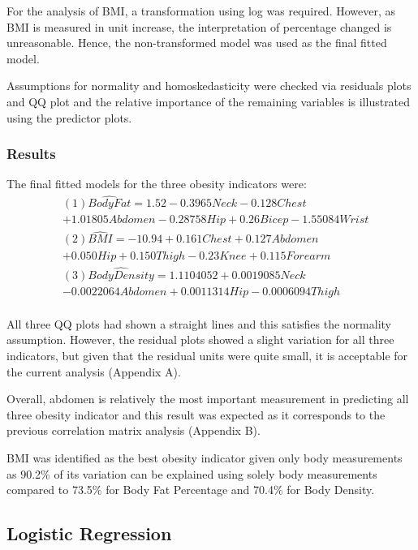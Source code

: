 \documentclass[a4paper,9pt,twocolumn,twoside,]{pinp}
\begin{document}
For the analysis of BMI, a transformation using log was required.
However, as BMI is measured in unit increase, the interpretation of
percentage changed is unreasonable. Hence, the non-transformed model was
used as the final fitted model.

Assumptions for normality and homoskedasticity were checked via
residuals plots and QQ plot and the relative importance of the remaining
variables is illustrated using the predictor plots.

\hypertarget{results}{%
\subsubsection{Results}\label{results}}

The final fitted models for the three obesity indicators were: \[ 
\begin{aligned}
&(1) \hat{Body Fat} = 1.52 -0.3965Neck - 0.128Chest\\
&+ 1.01805Abdomen -0.28758Hip + 0.26Bicep -1.55084Wrist\\
&(2) \hat{BMI} = -10.94 +0.161Chest + 0.127Abdomen\\
&+ 0.050Hip + 0.150Thigh - 0.23Knee + 0.115Forearm\\
&(3)\hat{Body Density} = 1.1104052 + 0.0019085 Neck\\
&- 0.0022064Abdomen + 0.0011314 Hip - 0.0006094 Thigh\\
\end{aligned}
\]

All three QQ plots had shown a straight lines and this satisfies the
normality assumption. However, the residual plots showed a slight
variation for all three indicators, but given that the residual units
were quite small, it is acceptable for the current analysis (Appendix
A).

Overall, abdomen is relatively the most important measurement in
predicting all three obesity indicator and this result was expected as
it corresponds to the previous correlation matrix analysis (Appendix B).

BMI was identified as the best obesity indicator given only body
measurements as 90.2\% of its variation can be explained using solely
body measurements compared to 73.5\% for Body Fat Percentage and 70.4\%
for Body Density.

\hypertarget{logistic-regression}{%
\subsection{Logistic Regression}\label{logistic-regression}}
\end{document}
